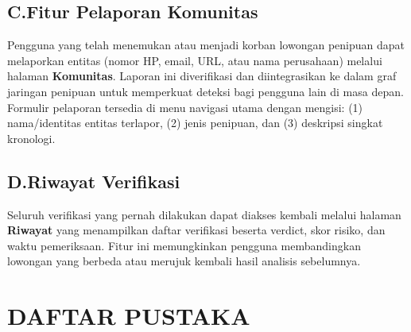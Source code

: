 \documentclass[12pt,a4paper]{article}
\begin{document}
\subsection*{C.\quad Fitur Pelaporan Komunitas}

Pengguna yang telah menemukan atau menjadi korban lowongan penipuan dapat melaporkan entitas (nomor HP, email, URL, atau nama perusahaan) melalui halaman \textbf{Komunitas}. Laporan ini diverifikasi dan diintegrasikan ke dalam graf jaringan penipuan untuk memperkuat deteksi bagi pengguna lain di masa depan. Formulir pelaporan tersedia di menu navigasi utama dengan mengisi: (1) nama/identitas entitas terlapor, (2) jenis penipuan, dan (3) deskripsi singkat kronologi.

\subsection*{D.\quad Riwayat Verifikasi}

Seluruh verifikasi yang pernah dilakukan dapat diakses kembali melalui halaman \textbf{Riwayat} yang menampilkan daftar verifikasi beserta verdict, skor risiko, dan waktu pemeriksaan. Fitur ini memungkinkan pengguna membandingkan lowongan yang berbeda atau merujuk kembali hasil analisis sebelumnya.

\clearpage
\section*{DAFTAR PUSTAKA}
\end{document}
